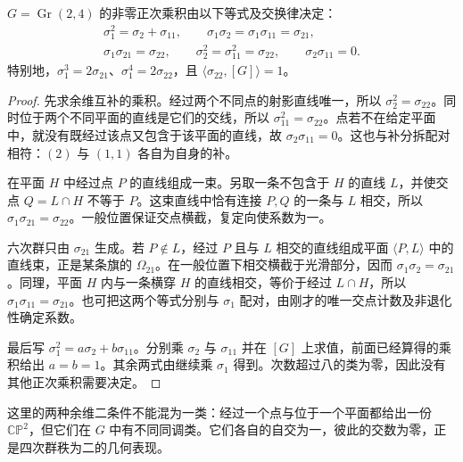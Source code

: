 \begin{proposition}\label{g2:prop:gr24-schubert-products}
	\(G=\operatorname{Gr}(2,4)\) 的非零正次乘积由以下等式及交换律决定：
	\begin{equation}\label{g2:eq:gr24-schubert-products}
	\begin{gathered}
		\sigma_1^2=\sigma_2+\sigma_{11},\qquad
		\sigma_1\sigma_2=\sigma_1\sigma_{11}=\sigma_{21},\\
		\sigma_1\sigma_{21}=\sigma_{22},\qquad
		\sigma_2^2=\sigma_{11}^2=\sigma_{22},\qquad
		\sigma_2\sigma_{11}=0.
	\end{gathered}
	\end{equation}
	特别地，\(\sigma_1^3=2\sigma_{21}\)、\(\sigma_1^4=2\sigma_{22}\)，且 \(\langle\sigma_{22},[G]\rangle=1\)。
\end{proposition}
\begin{proof}
	先求余维互补的乘积。经过两个不同点的射影直线唯一，所以 \(\sigma_2^2=\sigma_{22}\)。同时位于两个不同平面的直线是它们的交线，所以 \(\sigma_{11}^2=\sigma_{22}\)。点若不在给定平面中，就没有既经过该点又包含于该平面的直线，故 \(\sigma_2\sigma_{11}=0\)。这也与补分拆配对相符：\((2)\) 与 \((1,1)\) 各自为自身的补。

	在平面 \(H\) 中经过点 \(P\) 的直线组成一束。另取一条不包含于 \(H\) 的直线 \(L\)，并使交点 \(Q=L\cap H\) 不等于 \(P\)。这束直线中恰有连接 \(P,Q\) 的一条与 \(L\) 相交，所以 \(\sigma_1\sigma_{21}=\sigma_{22}\)。一般位置保证交点横截，复定向使系数为一。

	六次群只由 \(\sigma_{21}\) 生成。若 \(P\notin L\)，经过 \(P\) 且与 \(L\) 相交的直线组成平面 \(\langle P,L\rangle\) 中的直线束，正是某条旗的 \(\Omega_{21}\)。在一般位置下相交横截于光滑部分，因而 \(\sigma_1\sigma_2=\sigma_{21}\)。同理，平面 \(H\) 内与一条横穿 \(H\) 的直线相交，等价于经过 \(L\cap H\)，所以 \(\sigma_1\sigma_{11}=\sigma_{21}\)。也可把这两个等式分别与 \(\sigma_1\) 配对，由刚才的唯一交点计数及非退化性确定系数。

	最后写 \(\sigma_1^2=a\sigma_2+b\sigma_{11}\)。分别乘 \(\sigma_2\) 与 \(\sigma_{11}\) 并在 \([G]\) 上求值，前面已经算得的乘积给出 \(a=b=1\)。其余两式由继续乘 \(\sigma_1\) 得到。次数超过八的类为零，因此没有其他正次乘积需要决定。
\end{proof}

这里的两种余维二条件不能混为一类：经过一个点与位于一个平面都给出一份 \(\mathbb{CP}^2\)，但它们在 \(G\) 中有不同同调类。它们各自的自交为一，彼此的交数为零，正是四次群秩为二的几何表现。

\ProseParagraphBreak

